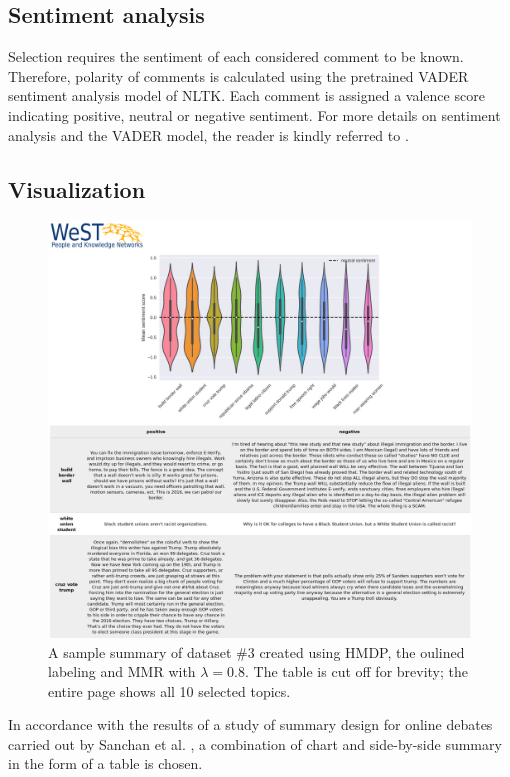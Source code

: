 \subsection{Sentiment analysis}
Selection requires the sentiment of each considered comment to be known. Therefore, polarity of comments is calculated using the pretrained VADER \cite{DBLP:conf/icwsm/HuttoG14} sentiment analysis model of NLTK. Each comment is assigned a valence score indicating positive, neutral or negative sentiment. For more details on sentiment analysis and the VADER model, the reader is kindly referred to \cite{DBLP:conf/icwsm/HuttoG14}. 

\subsection{Visualization}
\label{sample}
\begin{figure}[H]%
\label{sumfig}
\centering
\includegraphics[width=\textwidth]{img/sample_summary.png}%
\caption{A sample summary of dataset \#3 created using HMDP, the oulined labeling and MMR with $\lambda = 0.8$. The table is cut off for brevity; the entire page shows all 10 selected topics.}
\end{figure}
In accordance with the results of a study of summary design for online debates carried out by Sanchan et al. \cite{DBLP:journals/polibits/SanchanBA16}, a combination of chart and side-by-side summary in the form of a table is chosen.
